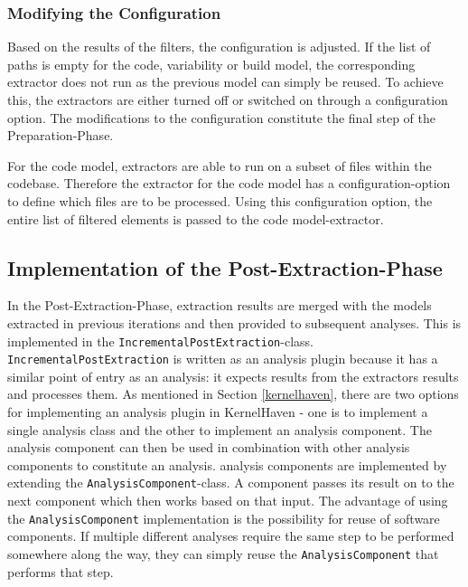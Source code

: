 \documentclass[a4paper]{article}
\begin{document}
\subsubsection{Modifying the Configuration}

Based on the results of the filters, the configuration is adjusted. If the list of paths is empty for the code, variability or build model, the corresponding extractor does not run as the previous model can simply be reused. To achieve this, the extractors are either turned off or switched on through a configuration option. The modifications to the configuration constitute the final step of the Preparation-Phase.

For the code model, extractors are able to run on a subset of files within the codebase. Therefore the extractor for the code model has a configuration-option to define which files are to be processed. Using this configuration option, the entire list of filtered elements is passed to the code model-extractor.


\subsection{Implementation of the Post-Extraction-Phase}\label{post-extraction-phase}

In the Post-Extraction-Phase, extraction results are merged with the models extracted in previous iterations and then provided to subsequent analyses. This is implemented in the \texttt{Incremental\-Post\-Extraction}-class. 
\texttt{Incremental\-Post\-Extraction} is written as an analysis plugin because it has a similar point of entry as an analysis: it expects results from the extractors results and processes them. As mentioned in Section \ref{kernelhaven}, there are two options for implementing an analysis plugin in KernelHaven - one is to implement a single analysis class and the other to implement an analysis component. The analysis component can then be used in combination with other analysis components to constitute an analysis. analysis components are implemented by extending the \texttt{Analysis\-Component}-class. A component passes its result on to the next component which then works based on that input. The advantage of using the \texttt{Analysis\-Component} implementation is the possibility for reuse of software components. If multiple different analyses require the same step to be performed somewhere along the way, they can simply reuse the \texttt{Analysis\-Component} that performs that step.
\end{document}
